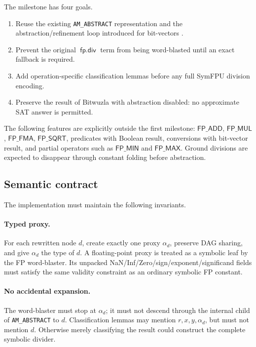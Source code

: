\documentclass[runningheads]{llncs}
\newcommand{\fpdiv}{\mathop{\mathsf{fp.div}}}
\newcommand{\proxy}{\alpha_d}
\begin{document}
The milestone has four goals.
\begin{enumerate}
  \item Reuse the existing \texttt{AM\_ABSTRACT} representation and the
        abstraction/refinement loop introduced for bit-vectors
        \cite{niemetz2024abstraction}.
  \item Prevent the original \(\fpdiv\) term from being word-blasted until an
        exact fallback is required.
  \item Add operation-specific classification lemmas before any full SymFPU
        division encoding.
  \item Preserve the result of Bitwuzla with abstraction disabled: no
        approximate SAT answer is permitted.
\end{enumerate}

The following features are explicitly outside the first milestone:
\(\mathsf{FP\_ADD}\), \(\mathsf{FP\_MUL}\), \(\mathsf{FP\_FMA}\),
\(\mathsf{FP\_SQRT}\), predicates with Boolean result, conversions with
bit-vector result, and partial operators such as \(\mathsf{FP\_MIN}\) and
\(\mathsf{FP\_MAX}\).  Ground divisions are expected to disappear through
constant folding before abstraction.

\subsection{Semantic contract}

The implementation must maintain the following invariants.

\paragraph{Typed proxy.}
For each rewritten node \(d\), create exactly one proxy \(\proxy\), preserve
DAG sharing, and give \(\proxy\) the type of \(d\).  A floating-point proxy is
treated as a symbolic leaf by the FP word-blaster.  Its unpacked
NaN/Inf/Zero/sign/exponent/significand fields must satisfy the same validity
constraint as an ordinary symbolic FP constant.

\paragraph{No accidental expansion.}
The word-blaster must stop at \(\proxy\); it must not descend through the
internal child of \texttt{AM\_ABSTRACT} to \(d\).  Classification lemmas may
mention \(r,x,y,\proxy\), but must not mention \(d\).  Otherwise merely
classifying the result could construct the complete symbolic divider.
\end{document}
